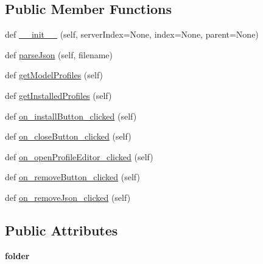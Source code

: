 \subsection*{Public Member Functions}
\begin{DoxyCompactItemize}
\item 
def \mbox{\hyperlink{class_dsg_tools_1_1_user_tools_1_1assign__profiles_1_1_assign_profiles_aa97bc57229c58e140fc6ae8631f75724}{\+\_\+\+\_\+init\+\_\+\+\_\+}} (self, server\+Index=None, index=None, parent=None)
\item 
def \mbox{\hyperlink{class_dsg_tools_1_1_user_tools_1_1assign__profiles_1_1_assign_profiles_aa1437028740f782813e3d7f1533aa2c7}{parse\+Json}} (self, filename)
\item 
def \mbox{\hyperlink{class_dsg_tools_1_1_user_tools_1_1assign__profiles_1_1_assign_profiles_a88946e6ab8e738c3afed611c7544c96f}{get\+Model\+Profiles}} (self)
\item 
def \mbox{\hyperlink{class_dsg_tools_1_1_user_tools_1_1assign__profiles_1_1_assign_profiles_ac095837e8ec74d5356d387d1f79e2cc1}{get\+Installed\+Profiles}} (self)
\item 
def \mbox{\hyperlink{class_dsg_tools_1_1_user_tools_1_1assign__profiles_1_1_assign_profiles_a1f7b99dd1a65b3adb9c9e5f3e97d4249}{on\+\_\+install\+Button\+\_\+clicked}} (self)
\item 
def \mbox{\hyperlink{class_dsg_tools_1_1_user_tools_1_1assign__profiles_1_1_assign_profiles_a563b41c7c68ac432b8e6300c1a1ee722}{on\+\_\+close\+Button\+\_\+clicked}} (self)
\item 
def \mbox{\hyperlink{class_dsg_tools_1_1_user_tools_1_1assign__profiles_1_1_assign_profiles_a9a407f938b7498037bec6fd0e58cfeaf}{on\+\_\+open\+Profile\+Editor\+\_\+clicked}} (self)
\item 
def \mbox{\hyperlink{class_dsg_tools_1_1_user_tools_1_1assign__profiles_1_1_assign_profiles_a0b757b8d4a1278a01c6dd48034a194c6}{on\+\_\+remove\+Button\+\_\+clicked}} (self)
\item 
def \mbox{\hyperlink{class_dsg_tools_1_1_user_tools_1_1assign__profiles_1_1_assign_profiles_aab8b73d37d5f05c22f96d45661facd38}{on\+\_\+remove\+Json\+\_\+clicked}} (self)
\end{DoxyCompactItemize}
\subsection*{Public Attributes}
\begin{DoxyCompactItemize}
\item 
\mbox{\label{class_dsg_tools_1_1_user_tools_1_1assign__profiles_1_1_assign_profiles_a00ae8b7c4d7f611fb9e61ba3fae1508b}} 
{\bfseries folder}
\end{DoxyCompactItemize}


